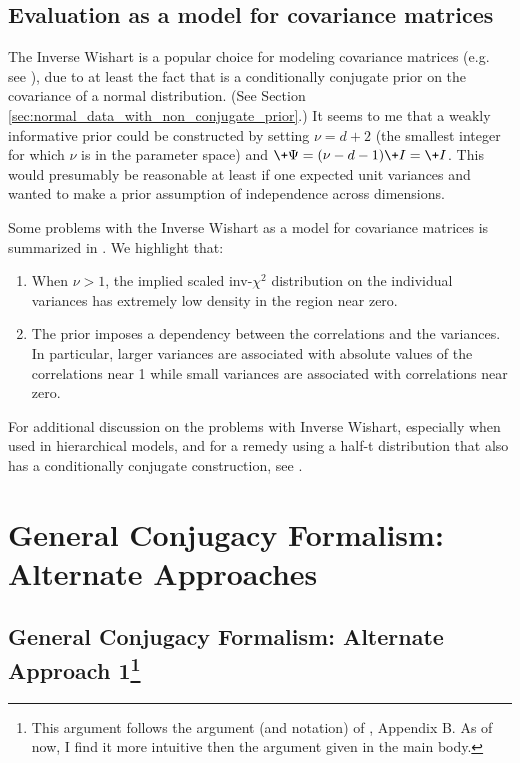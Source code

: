 \documentclass{article} %
\begin{document}
\subsection{Evaluation as a model for covariance matrices}

The  Inverse Wishart is a popular choice for modeling covariance matrices (e.g.  see \cite{hoff2009first}),  due to at least the fact that is a  conditionally conjugate prior on the covariance of a normal distribution.   (See Section \ref{sec:normal_data_with_non_conjugate_prior}.)   It seems to me that a weakly informative prior could be constructed by setting  $\nu = d+2$ (the smallest integer for which $\nu$ is in the parameter space) and $\+\Psi = (\nu -d - 1) \+I = \+I$.   This would presumably be reasonable at least if one expected unit variances and wanted to make a prior assumption of independence across dimensions.

Some problems with the Inverse Wishart as a model for covariance matrices is summarized in  \cite{alvarez2014bayesian}.    We highlight that:
\begin{enumerate}
\item  When $\nu  > 1$,   the implied scaled inv-$\chi^2$ distribution on the individual variances has extremely low density in the region near zero.   
\item The prior imposes a dependency between the correlations and the variances. In particular,  larger variances are associated with absolute values of the correlations near 1 while small variances
are associated with correlations near zero.    
\end{enumerate}
For additional discussion on the problems with Inverse Wishart,  especially when used in hierarchical models,  and for a remedy using a half-t distribution that also has a conditionally conjugate construction,  see \cite{wojnowicz2022categorical}.


\section{General Conjugacy Formalism: Alternate Approaches}

\subsection{General Conjugacy Formalism: Alternate Approach 1\footnote{This argument follows the argument (and notation) of \cite{johnson2016composing}, Appendix B.  As of now, I find it more intuitive then the argument given in the main body.}}
\label{sec:general_conjugacy_alternate_argument}
\end{document}
